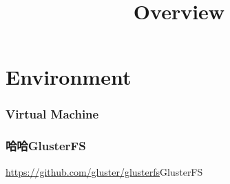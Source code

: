 \documentclass{article}
\title{Overview}
\begin{document}
\maketitle

\tableofcontents
\part{Environment}
\section{Virtual Machine}
\section{哈哈GlusterFS}
\url{https://github.com/gluster/glusterfs}{GlusterFS}
\end{document}
